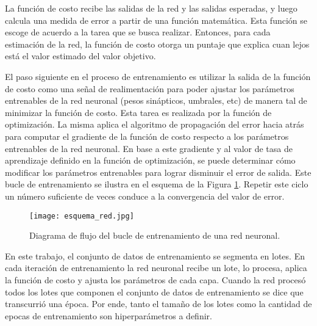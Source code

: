 La función de costo recibe las salidas de la red y las salidas esperadas, y luego calcula una medida de error a partir de una función matemática. Esta función se escoge de acuerdo a la tarea que se busca realizar. Entonces, para cada estimación de la red, la función de costo otorga un puntaje que explica cuan lejos está el valor estimado del valor objetivo.  

El paso siguiente en el proceso de entrenamiento es utilizar la salida de la función de costo como una señal de realimentación para poder ajustar los parámetros entrenables de la red neuronal (pesos sinápticos, umbrales, etc) de manera tal de minimizar la función de costo. Esta tarea es realizada por la función de optimización. La misma aplica el algoritmo de propagación del error hacia atrás para computar el gradiente de la función de costo respecto a los parámetros entrenables de la red neuronal. En base a este gradiente y al valor de tasa de aprendizaje definido en la función de optimización, se puede determinar cómo modificar los parámetros entrenables para lograr disminuir el error de salida. Este bucle de entrenamiento se ilustra en el esquema de la Figura \ref{fig:esquema}. Repetir este ciclo un número suficiente de veces conduce a la convergencia del valor de error. 

\begin{figure}[H]
  \centering{}
  \texttt{[image: esquema\_red.jpg]}
  \caption{Diagrama de flujo del bucle de entrenamiento de una red neuronal.}
  \label{fig:esquema}
\end{figure}


En este trabajo, el conjunto de datos de entrenamiento se segmenta en lotes. En cada iteración de entrenamiento la red neuronal recibe un lote, lo procesa, aplica la función de costo y ajusta los parámetros de cada capa. Cuando la red procesó todos los lotes que componen el conjunto de datos de entrenamiento se dice que transcurrió una época. Por ende, tanto el tamaño de los lotes como la cantidad de epocas de entrenamiento son hiperparámetros a definir.

